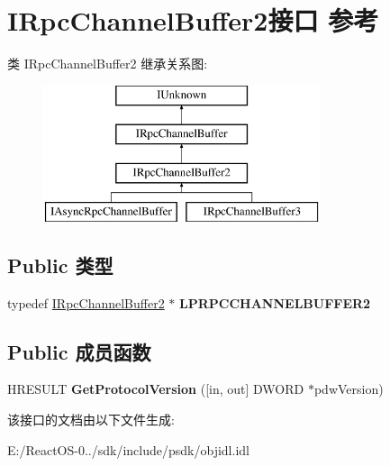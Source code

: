 \hypertarget{interface_i_rpc_channel_buffer2}{}\section{I\+Rpc\+Channel\+Buffer2接口 参考}
\label{interface_i_rpc_channel_buffer2}
类 I\+Rpc\+Channel\+Buffer2 继承关系图\+:\begin{figure}[H]
\begin{center}
\leavevmode
\includegraphics[height=4.000000cm]{interface_i_rpc_channel_buffer2}
\end{center}
\end{figure}
\subsection*{Public 类型}
\begin{DoxyCompactItemize}
\item 
\mbox{\label{interface_i_rpc_channel_buffer2_aa3c368584596b0992a9b74c23f460738}} 
typedef \hyperlink{interface_i_rpc_channel_buffer2}{I\+Rpc\+Channel\+Buffer2} $\ast$ {\bfseries L\+P\+R\+P\+C\+C\+H\+A\+N\+N\+E\+L\+B\+U\+F\+F\+E\+R2}
\end{DoxyCompactItemize}
\subsection*{Public 成员函数}
\begin{DoxyCompactItemize}
\item 
\mbox{\label{interface_i_rpc_channel_buffer2_a1cc96db58495dec7ec7d93d807010490}} 
H\+R\+E\+S\+U\+LT {\bfseries Get\+Protocol\+Version} (\mbox{[}in, out\mbox{]} D\+W\+O\+RD $\ast$pdw\+Version)
\end{DoxyCompactItemize}


该接口的文档由以下文件生成\+:\begin{DoxyCompactItemize}
\item 
E\+:/\+React\+O\+S-\/0../sdk/include/psdk/objidl.\+idl\end{DoxyCompactItemize}
